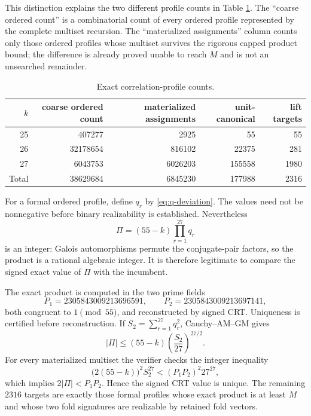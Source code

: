 \documentclass[11pt,a4paper]{article}
\theoremstyle{definition}
\theoremstyle{remark}
\newcommand{\Pone}{2305843009213696591}
\newcommand{\Ptwo}{2305843009213697141}
\begin{document}
This distinction explains the two different profile counts in Table
\ref{tab:profile-counts}.  The ``coarse ordered count'' is a combinatorial count
of every ordered profile represented by the complete multiset recursion.  The
``materialized assignments'' column counts only those ordered profiles whose
multiset survives the rigorous capped product bound; the difference is already
proved unable to reach $M$ and is not an unsearched remainder.

\begin{table}[ht]
\centering
\small
\begin{tabular}{@{}r|r r r r@{}}
\toprule
$k$ & coarse ordered count & materialized assignments & unit-canonical & lift targets\\
\midrule
25&407277&2925&55&55\\
26&32178654&816102&22375&281\\
27&6043753&6026203&155558&1980\\
\midrule
Total&38629684&6845230&177988&2316\\
\bottomrule
\end{tabular}
\caption{Exact correlation-profile counts.}
\label{tab:profile-counts}
\end{table}

For a formal ordered profile, define $q_r$ by
\eqref{eq:q-deviation}.  The values need not be nonnegative before binary
realizability is established.  Nevertheless
\[
  \Pi=(55-k)\prod_{r=1}^{27}q_r
\]
is an integer: Galois automorphisms permute the conjugate-pair factors, so the
product is a rational algebraic integer.  It is therefore legitimate to
compare the signed exact value of $\Pi$ with the incumbent.

The exact product is computed in the two prime fields
\[
  P_1=\Pone,\qquad P_2=\Ptwo,
\]
both congruent to $1\pmod{55}$, and reconstructed by signed CRT.  Uniqueness is
certified before reconstruction.  If
$S_2=\sum_{r=1}^{27}q_r^2$, Cauchy--AM--GM gives
\[
  |\Pi|\le(55-k)\left(\frac{S_2}{27}\right)^{27/2}.
\]
For every materialized multiset the verifier checks the integer inequality
\begin{equation}
\label{eq:crt-capacity}
  \bigl(2(55-k)\bigr)^2 S_2^{27}
     <(P_1P_2)^2 27^{27},
\end{equation}
which implies $2|\Pi|<P_1P_2$.  Hence the signed CRT value is unique.  The
remaining $2316$ targets are exactly those formal profiles whose exact product
is at least $M$ and whose two fold signatures are realizable by retained fold
vectors.
\end{document}

